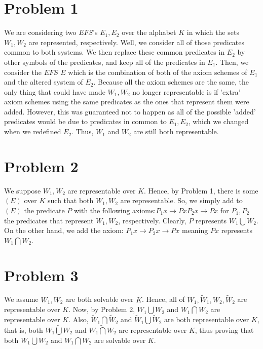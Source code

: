 \documentclass{article}
\theoremstyle{definition}
\begin{document}
\section*{Problem 1}
We are considering two $EFS$'s $E_1, E_2$ over the alphabet $K$ in which the sets $W_1, W_2$ are represented, respectively. Well, we consider all of 
those predicates common to both systems. We then replace these common predicates in $E_2$ by other symbols of the predicates, and keep all of the predicates 
in $E_1$. Then, we consider the $EFS$ $E$ which is the combination of both of the axiom schemes of $E_1$ and the altered system of $E_2$. Because all 
the axiom schemes are the same, the only thing that could have made $W_1, W_2$ no longer representable is if 'extra' axiom schemes using the same 
predicates as the ones that represent them were added. However, this was guaranteed not to happen as all of the possible 'added' predicates 
would be due to predicates in common to $E_1, E_2$, which we changed when we redefined $E_2$. Thus, $W_1$ and $W_2$ are still both representable.
\section*{Problem 2}
We suppose $W_1, W_2$ are representable over $K$. Hence, by Problem 1, there is some $(E)$ over $K$ such that both $W_1, W_2$ are representable. So, 
we simply add to $(E)$ the predicate $P$ with the following axioms:\newline $P_1x\rightarrow Px$\newline $P_2x\rightarrow Px$ for $P_1, P_2$ the predicates 
that represent $W_1, W_2$, respectively. Clearly, $P$ represents $W_1\bigcup W_2$. On the other hand, we add the axiom:\newline
$P_1x\rightarrow P_2x\rightarrow Px$ meaning $Px$ represents $W_1\bigcap W_2$.
\section*{Problem 3}
We assume $W_1, W_2$ are both solvable over $K$. Hence, all of $W_1, \widetilde W_1, W_2, \widetilde W_2$ are representable over $K$. Now, by Problem 2, 
$W_1\bigcup W_2$ and $W_1\bigcap W_2$ are representable over $K$. Also, $\widetilde W_1\bigcap \widetilde W_2$ and $\widetilde W_1\bigcup \widetilde W_2$ 
are both representable over $K$, that is, both $\widetilde {W_1\bigcup W_2}$ and $\widetilde {W_1\bigcap W_2}$ are representable over $K$, thus proving
 that both $W_1\bigcup W_2$ and $W_1\bigcap W_2$ are solvable over $K$.
\end{document}

